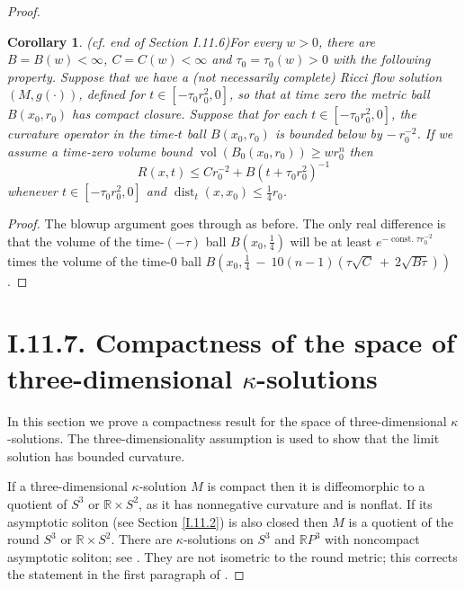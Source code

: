 \documentclass[12pt]{amsart}
\newcommand{\const}{\operatorname{const.}}
\newcommand{\dist}{\operatorname{dist}}
\newcommand{\R}{{\mathbb R}}
\newcommand{\vol}{\operatorname{vol}}
\numberwithin{equation}{section}
\theoremstyle{plain}
\newtheorem{corollary}[equation]{Corollary}
\theoremstyle{definition}
\theoremstyle{remark}
\begin{document}
\begin{proof}
\begin{corollary} (cf. end of Section I.11.6)\label{I.11.6end}
For every $w > 0$, there are $B = B(w) < \infty$, $C = C(w) < \infty$ and
$\tau_0 = \tau_0(w) > 0$ with the following property.
Suppose that we have a (not necessarily complete) Ricci flow
solution $(M, g(\cdot))$, defined for $t \in [- \tau_0 r_0^2, 0]$, so that at time zero
the metric ball $B(x_0, r_0)$ has compact closure. Suppose that 
for each $t \in [- \tau_0 r_0^2, 0]$, the 
curvature operator in the
time-$t$ ball $B(x_0, r_0)$ is bounded below by $- \: r_0^{-2}$. 
If we assume a time-zero volume bound $\vol(B_0(x_0, r_0))
\ge w r_0^n$ then
\begin{equation} 
R(x,t) \le C r_0^{-2} + B (t + \tau_0 r_0^2)^{-1}
\end{equation}
whenever $t \in [- \tau_0 r_0^2,0]$ and $\dist_t(x, x_0) \le \frac14 r_0$.
\end{corollary}
\begin{proof}
The blowup argument goes through as before.
The only real difference is that the volume of the
time-$(- \tau)$ ball $B(x_0, \frac14)$ will be at least
$e^{-\const \tau r_0^{-2}}$ times the volume of the
time-$0$ ball $B(x_0, \frac14 \: - \: 10(n-1)(\tau \sqrt{C} \: + \:
2 \sqrt{B \tau}))$.
\end{proof}

\section{I.11.7. Compactness of the space of three-dimensional
$\kappa$-solutions}
\label{pf11.7}

In this section we prove a compactness result for the space of three-dimensional
$\kappa$-solutions.  The three-dimensionality assumption is used to
show that
the limit solution has bounded curvature.

If a three-dimensional $\kappa$-solution $M$ is compact then it is
diffeomorphic to a quotient of $S^3$ or $\R \times S^2$, as it has 
nonnegative curvature and is nonflat.
If its asymptotic 
soliton (see Section \ref{I.11.2}) is also closed then 
$M$ is a quotient of the round $S^3$ or $\R \times S^2$. 
There are $\kappa$-solutions on $S^3$ and $\R P^3$ with noncompact
asymptotic soliton; see \cite[Section 1.4]{Perelman2}.
They are not isometric to the round metric; this corrects the statement in
the first paragraph of \cite[Section 11.7]{Perelman}.


\end{proof}
\end{document}
